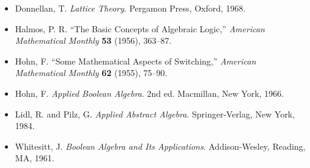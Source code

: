  
{\small
\begin{itemize}
 
\item[{\bf [1]}]
Donnellan, T. {\it Lattice Theory}. Pergamon Press, Oxford,
1968.
 
\item[{\bf [2]}]
Halmos, P. R. ``The Basic Concepts of Algebraic Logic,''
{\it American Mathematical Monthly} {\bf 53} (1956),
363--87.
 
\item[{\bf [3]}]
Hohn, F. ``Some Mathematical Aspects of Switching,'' {\it
American Mathematical Monthly} {\bf 62} (1955), 75--90.
 
\item[{\bf [4]}]
Hohn, F. {\it Applied Boolean Algebra}. 2nd ed. Macmillan, New York,
1966. 
  
 
\item[{\bf [5]}]
Lidl, R. and Pilz, G. {\it Applied Abstract Algebra}.
Springer-Verlag, New York, 1984.
 
\item[{\bf [6]}]
Whitesitt, J. {\it Boolean Algebra and Its
Applications}. Addison-Wesley, Reading, MA, 1961.
 
\end{itemize}
}
 
 
 


